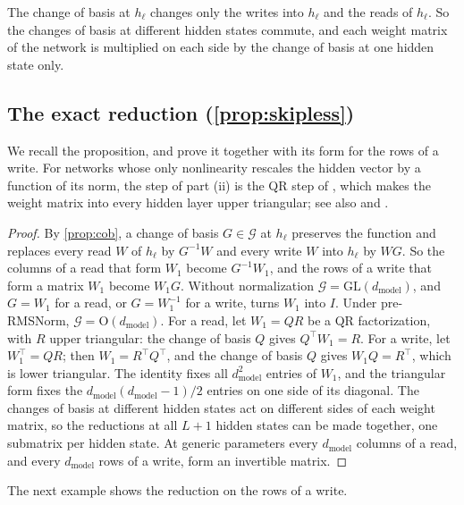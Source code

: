 \documentclass[10pt]{article}
\theoremstyle{definition}
\theoremstyle{remark}
\newcommand{\dm}{d_{\mathrm{model}}}
\newcommand{\GL}{\mathrm{GL}}
\newcommand{\Ort}{\mathrm{O}}
\newcommand{\G}{\mathcal{G}}
\begin{document}
The change of basis at $h_\ell$ changes only the writes into $h_\ell$ and the reads of $h_\ell$. So the changes of basis at different hidden states commute, and each weight matrix of the network is multiplied on each side by the change of basis at one hidden state only.

\subsection{The exact reduction\texorpdfstring{ (\cref{prop:skipless})}{}}\label{app:prf-normalform}

We recall the proposition, and prove it together with its form for the rows of a write. For networks whose only nonlinearity rescales the hidden vector by a function of its norm, the step of part (ii) is the QR step of \citet[Theorem~5]{ganev2021universal}, which makes the weight matrix into every hidden layer upper triangular; see also \citet[Proposition~C.1]{ganev2022quiver} and \citet{bird2026isotropic}.
\propSkipless*

\begin{proof}
By \cref{prop:cob}, a change of basis $G \in \G$ at $h_\ell$ preserves the function and replaces every read $W$ of $h_\ell$ by $G^{-1}W$ and every write $W$ into $h_\ell$ by $WG$. So the columns of a read that form $W_1$ become $G^{-1}W_1$, and the rows of a write that form a matrix $W_1$ become $W_1G$. Without normalization $\G = \GL(\dm)$, and $G = W_1$ for a read, or $G = W_1^{-1}$ for a write, turns $W_1$ into $I$. Under pre-RMSNorm, $\G = \Ort(\dm)$. For a read, let $W_1 = QR$ be a QR factorization, with $R$ upper triangular: the change of basis $Q$ gives $Q^\top W_1 = R$. For a write, let $W_1^\top = QR$; then $W_1 = R^\top Q^\top$, and the change of basis $Q$ gives $W_1Q = R^\top$, which is lower triangular. The identity fixes all $\dm^2$ entries of $W_1$, and the triangular form fixes the $\dm(\dm-1)/2$ entries on one side of its diagonal. The changes of basis at different hidden states act on different sides of each weight matrix, so the reductions at all $L+1$ hidden states can be made together, one submatrix per hidden state. At generic parameters every $\dm$ columns of a read, and every $\dm$ rows of a write, form an invertible matrix.
\end{proof}

The next example shows the reduction on the rows of a write.
\end{document}
